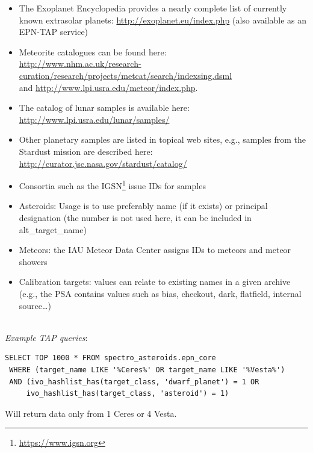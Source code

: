 \documentclass[11pt,a4paper]{ivoa}
\begin{document}
\begin{itemize}
\item The Exoplanet Encyclopedia provides a nearly
complete list of currently known extrasolar planets:
\url{http://exoplanet.eu/index.php}
(also available as an EPN-TAP service)

\item Meteorite catalogues can be found here:\\
\url{http://www.nhm.ac.uk/research-curation/research/projects/metcat/search/indexsing.dsml}
\\and
\url{http://www.lpi.usra.edu/meteor/index.php}.

\item The catalog of lunar samples is available here:
\url{http://www.lpi.usra.edu/lunar/samples/}

\item Other planetary samples are listed in topical web sites,
e.g., samples from the Stardust mission are described here:\\
\url{http://curator.jsc.nasa.gov/stardust/catalog/}

\item Consortia such as the IGSN\footnote{\url{https://www.igsn.org}}
issue IDs for samples

\item Asteroids: Usage is to use preferably name (if it exists) or
principal designation (the number is not used here, it can be included
in alt\_target\_name)

\item Meteors: the IAU Meteor Data Center assigns IDs to meteors and
meteor showers

\item Calibration targets: values can relate to existing names in a
given archive (e.g., the PSA contains values such as bias, checkout,
dark, flatfield, internal source…)
\end{itemize}

\textbf{\\}
\emph{Example TAP queries}:


\begin{verbatim}
SELECT TOP 1000 * FROM spectro_asteroids.epn_core
 WHERE (target_name LIKE '%Ceres%' OR target_name LIKE '%Vesta%')
 AND (ivo_hashlist_has(target_class, 'dwarf_planet') = 1 OR
     ivo_hashlist_has(target_class, 'asteroid') = 1)
\end{verbatim}

Will return data only from 1 Ceres or 4 Vesta.
\end{document}
